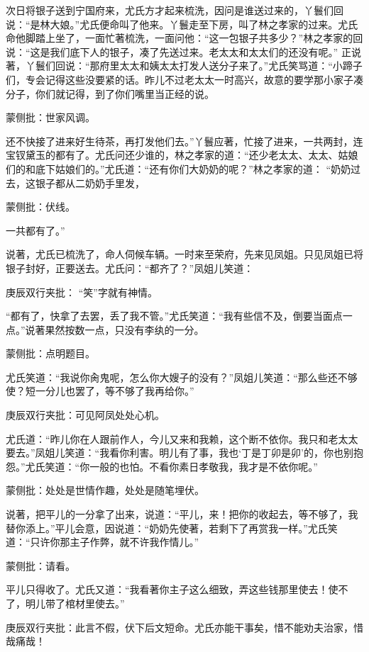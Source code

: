 \begin{parag}
    次日将银子送到宁国府来，尤氏方才起来梳洗，因问是谁送过来的，丫鬟们回说：“是林大娘。”尤氏便命叫了他来。丫鬟走至下房，叫了林之孝家的过来。尤氏命他脚踏上坐了，一面忙著梳洗，一面问他：“这一包银子共多少？”林之孝家的回说：“这是我们底下人的银子，凑了先送过来。老太太和太太们的还没有呢。” 正说著，丫鬟们回说：“那府里太太和姨太太打发人送分子来了。”尤氏笑骂道：“小蹄子们，专会记得这些没要紧的话。昨儿不过老太太一时高兴，故意的要学那小家子凑分子，你们就记得，到了你们嘴里当正经的说。\begin{note}蒙侧批：世家风调。\end{note}还不快接了进来好生待茶，再打发他们去。”丫鬟应著，忙接了进来，一共两封，连宝钗黛玉的都有了。尤氏问还少谁的，林之孝家的道：“还少老太太、太太、姑娘们的和底下姑娘们的。”尤氏道：“还有你们大奶奶的呢？”林之孝家的道： “奶奶过去，这银子都从二奶奶手里发，\begin{note}蒙侧批：伏线。\end{note}一共都有了。”
\end{parag}


\begin{parag}
    说著，尤氏已梳洗了，命人伺候车辆。一时来至荣府，先来见凤姐。只见凤姐已将银子封好，正要送去。尤氏问：“都齐了？”凤姐儿笑道：\begin{note}庚辰双行夹批： “笑”字就有神情。\end{note}“都有了，快拿了去罢，丢了我不管。”尤氏笑道：“我有些信不及，倒要当面点一点。”说著果然按数一点，只没有李纨的一分。\begin{note}蒙侧批：点明题目。\end{note}尤氏笑道：“我说你肏鬼呢，怎么你大嫂子的没有？”凤姐儿笑道：“那么些还不够使？短一分儿也罢了，等不够了我再给你。”\begin{note}庚辰双行夹批：可见阿凤处处心机。\end{note}尤氏道：“昨儿你在人跟前作人，今儿又来和我赖，这个断不依你。我只和老太太要去。”凤姐儿笑道：“我看你利害。明儿有了事，我也‘丁是丁卯是卯’的，你也别抱怨。”尤氏笑道：“你一般的也怕。不看你素日孝敬我，我才是不依你呢。”\begin{note}蒙侧批：处处是世情作趣，处处是随笔埋伏。\end{note}说著，把平儿的一分拿了出来，说道：“平儿，来！把你的收起去，等不够了，我替你添上。”平儿会意，因说道：“奶奶先使著，若剩下了再赏我一样。”尤氏笑道：“只许你那主子作弊，就不许我作情儿。”\begin{note}蒙侧批：请看。\end{note}平儿只得收了。尤氏又道：“我看著你主子这么细致，弄这些钱那里使去！使不了，明儿带了棺材里使去。”\begin{note}庚辰双行夹批：此言不假，伏下后文短命。尤氏亦能干事矣，惜不能劝夫治家，惜哉痛哉！\end{note}
\end{parag}


